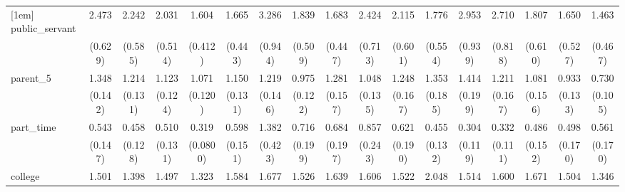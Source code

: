 {\begin{tabular}{l*{16}{c}}
[1em]
public\_servant      &       2.473\sym{***}&       2.242\sym{**} &       2.031\sym{**} &       1.604         &       1.665         &       3.286\sym{***}&       1.839\sym{*}  &       1.683         &       2.424\sym{**} &       2.115\sym{**} &       1.776         &       2.953\sym{***}&       2.710\sym{***}&       1.807         &       1.650         &       1.463         \\
                    &     (0.629)         &     (0.585)         &     (0.514)         &     (0.412)         &     (0.443)         &     (0.944)         &     (0.509)         &     (0.447)         &     (0.713)         &     (0.601)         &     (0.554)         &     (0.939)         &     (0.818)         &     (0.610)         &     (0.527)         &     (0.467)         \\
[1em]
parent\_5            &       1.348\sym{**} &       1.214         &       1.123         &       1.071         &       1.150         &       1.219         &       0.975         &       1.281\sym{*}  &       1.048         &       1.248         &       1.353\sym{*}  &       1.414\sym{*}  &       1.211         &       1.081         &       0.933         &       0.730\sym{*}  \\
                    &     (0.142)         &     (0.131)         &     (0.124)         &     (0.120)         &     (0.131)         &     (0.146)         &     (0.122)         &     (0.157)         &     (0.135)         &     (0.167)         &     (0.185)         &     (0.199)         &     (0.167)         &     (0.156)         &     (0.133)         &     (0.105)         \\
[1em]
part\_time           &       0.543\sym{*}  &       0.458\sym{**} &       0.510\sym{**} &       0.319\sym{***}&       0.598\sym{*}  &       1.382         &       0.716         &       0.684         &       0.857         &       0.621         &       0.455\sym{**} &       0.304\sym{**} &       0.332\sym{***}&       0.486\sym{*}  &       0.498\sym{*}  &       0.561         \\
                    &     (0.147)         &     (0.128)         &     (0.131)         &    (0.0800)         &     (0.151)         &     (0.423)         &     (0.199)         &     (0.197)         &     (0.243)         &     (0.190)         &     (0.132)         &     (0.119)         &     (0.111)         &     (0.152)         &     (0.170)         &     (0.170)         \\
[1em]
college             &       1.501\sym{**} &       1.398\sym{*}  &       1.497\sym{**} &       1.323\sym{*}  &       1.584\sym{**} &       1.677\sym{***}&       1.526\sym{**} &       1.639\sym{**} &       1.606\sym{**} &       1.522\sym{*}  &       2.048\sym{***}&       1.514\sym{*}  &       1.600\sym{**} &       1.671\sym{**} &       1.504\sym{*}  &       1.346         \\

\end{tabular}}
